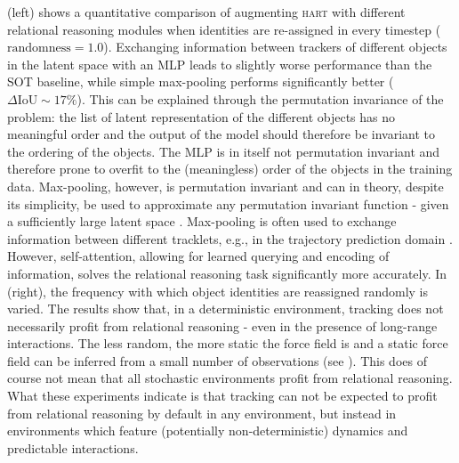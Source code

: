  (left) shows a quantitative comparison of augmenting \textsc{hart} with different relational reasoning modules when identities are re-assigned in every timestep ($\text{randomness} = 1.0$). Exchanging information between trackers of different objects in the latent space with an MLP leads to slightly worse performance than the SOT baseline, while simple max-pooling performs significantly better ($\Delta \text{IoU} \sim 17\%$). This can be explained through the permutation invariance of the problem: the list of latent representation of the different objects has no meaningful order and the output of the model should therefore be invariant to the ordering of the objects. The MLP is in itself not permutation invariant and therefore prone to overfit to the (meaningless) order of the objects in the training data. Max-pooling, however, is permutation invariant and can in theory, despite its simplicity, be used to approximate any permutation invariant function - given a sufficiently large latent space \cite{Zaheer2017,Wagstaff2019}. Max-pooling is often used to exchange information between different tracklets, e.g., in the trajectory prediction domain \cite{social-lstm,Gupta2019}. However, self-attention, allowing for learned querying and encoding of information, solves the relational reasoning task significantly more accurately. In  (right), the frequency with which object identities are reassigned randomly is varied. The results show that, in a deterministic environment, tracking does not necessarily profit from relational reasoning - even in the presence of long-range interactions. The less random, the more static the force field is and a static force field can be inferred from a small number of observations (see ). This does of course not mean that all stochastic environments profit from relational reasoning. What these experiments indicate is that tracking can not be expected to profit from relational reasoning by default in any environment, but instead in environments which feature (potentially non-deterministic) dynamics and predictable interactions.